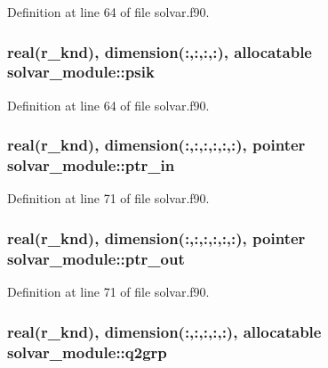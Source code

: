 Definition at line 64 of file solvar.\-f90.

\hypertarget{classsolvar__module_a9d00ffefc30874b3b293efb307b3e551}{
\subsubsection[{psik}]{\setlength{\rightskip}{0pt plus 5cm}real(r\-\_\-knd), dimension(\-:,\-:,\-:,\-:), allocatable solvar\-\_\-module\-::psik}}\label{classsolvar__module_a9d00ffefc30874b3b293efb307b3e551}


Definition at line 64 of file solvar.\-f90.

\hypertarget{classsolvar__module_ac95d5a5e2f90e8f827801c3616afd3cc}{
\subsubsection[{ptr\-\_\-in}]{\setlength{\rightskip}{0pt plus 5cm}real(r\-\_\-knd), dimension(\-:,\-:,\-:,\-:,\-:,\-:), pointer solvar\-\_\-module\-::ptr\-\_\-in}}\label{classsolvar__module_ac95d5a5e2f90e8f827801c3616afd3cc}


Definition at line 71 of file solvar.\-f90.

\hypertarget{classsolvar__module_aaa582c1084c73e20d39d834455a825d1}{
\subsubsection[{ptr\-\_\-out}]{\setlength{\rightskip}{0pt plus 5cm}real(r\-\_\-knd), dimension(\-:,\-:,\-:,\-:,\-:,\-:), pointer solvar\-\_\-module\-::ptr\-\_\-out}}\label{classsolvar__module_aaa582c1084c73e20d39d834455a825d1}


Definition at line 71 of file solvar.\-f90.

\hypertarget{classsolvar__module_a251ab88a6dab1f3da07d22096331b932}{
\subsubsection[{q2grp}]{\setlength{\rightskip}{0pt plus 5cm}real(r\-\_\-knd), dimension(\-:,\-:,\-:,\-:,\-:), allocatable solvar\-\_\-module\-::q2grp}}\label{classsolvar__module_a251ab88a6dab1f3da07d22096331b932}


